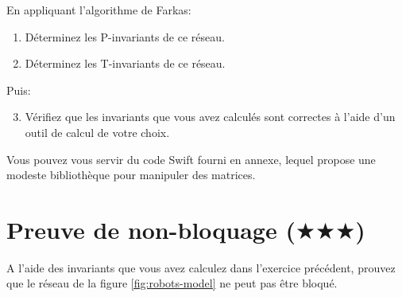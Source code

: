 \documentclass[a4paper, titlepage]{article}
\numberwithin{figure}{section}
\numberwithin{table}{section}
\begin{document}
En appliquant l'algorithme de Farkas:
\begin{enumerate}
  \item Déterminez les P-invariants de ce réseau.
  \item Déterminez les T-invariants de ce réseau.
\end{enumerate}
Puis:
\begin{enumerate}
  \setcounter{enumi}{2}
  \item Vérifiez que les invariants que vous avez calculés sont correctes à l'aide d'un outil de calcul de votre choix.
\end{enumerate}

Vous pouvez vous servir du code Swift fourni en annexe, lequel propose une modeste bibliothèque pour manipuler des matrices.

\section{Preuve de non-bloquage ($\bigstar\bigstar\bigstar$)}

A l'aide des invariants que vous avez calculez dans l'exercice précédent, prouvez que le réseau de la figure \ref{fig:robots-model} ne peut pas être bloqué.
\end{document}
